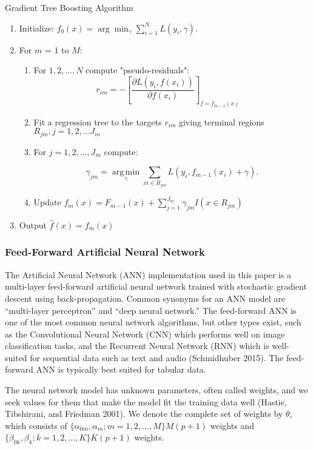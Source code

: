 \documentclass[12pt,]{article}
\begin{document}
\begin{algorithm}
  \caption{Gradient Tree Boosting Algorithm}\label{alg:GBMAlo}
\begin{enumerate}
\item Initialize: $f_0(x) = \arg\min_\gamma \sum_{i=1}^N L(y_i, \gamma).$
\item For $m$ = 1 to $M$:
  \begin{enumerate}
  \item For $1,2,...,N$ compute "pseudo-residuals":
  $$
   r_{im} = -\left[\frac{\partial L(y_i, f(x_i))}{\partial f(x_i)}\right]_{f=f_{m-1}(x)} \quad
  $$
  \item Fit a regression tree to the targets $r_{im}$ giving terminal regions $R_{jm}, j = 1,2,...J_m$
  \item For $j = 1,2,...,J_m$ compute:
  
  $$
  \gamma_{jm} = \underset{\gamma}{\operatorname{arg\,min}} \sum_{xi \in R_{jm}} L\left(y_i, f_{m-1}(x_i) + \gamma \right).
  $$
  \item Update $f_m(x) = F_{m-1}(x) + \sum_{j=1}^{J_m}\gamma_{jm}I(x \in R_{jm})$
  \end{enumerate}
\item Output $\hat{f}(x) = f_m(x)$
\end{enumerate}
\end{algorithm}

\hypertarget{feed-forward-artificial-neural-network}{%
\subsubsection{Feed-Forward Artificial Neural
Network}\label{feed-forward-artificial-neural-network}}

The Artificial Neural Network (ANN) implementation used in this paper is
a multi-layer feed-forward artificial neural network trained with
stochastic gradient descent using back-propagation. Common synonyms for
an ANN model are ``multi-layer perceptron'' and ``deep neural network.''
The feed-forward ANN is one of the most common neural network
algorithms, but other types exist, such as the Convolutional Neural
Network (CNN) which performs well on image classification tasks, and the
Recurrent Neural Network (RNN) which is well-suited for sequential data
such as text and audio (Schmidhuber 2015). The feed-forward ANN is
typically best suited for tabular data.

The neural network model has unknown parameters, often called weights,
and we seek values for them that make the model fit the training data
well (Hastie, Tibshirani, and Friedman 2001). We denote the complete set
of weights by \(\theta\), which consists of
\(\{\alpha_{0m},\alpha_m;m=1,2,...,M\} M(p+1)\) weights and
\(\{\beta_{0k},\beta_k;k=1,2,...,K\} K(p+1)\) weights.
\end{document}
